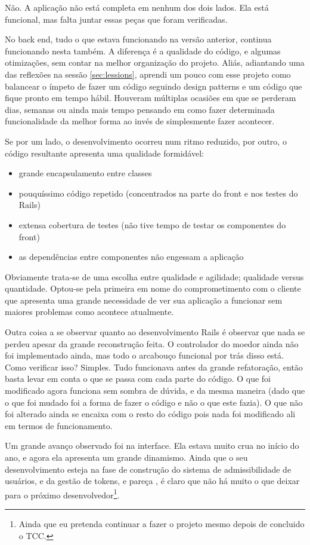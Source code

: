 Não. A aplicação não está completa em nenhum dos dois lados. Ela está funcional, mas falta juntar essas peças que foram
verificadas.

No back end, tudo o que estava funcionando  na versão anterior, continua funcionando nesta também. A diferença é a
qualidade do código, e algumas otimizações, sem contar na melhor organização do projeto. Aliás, adiantando uma das
reflexões na sessão \ref{sec:lessions}, aprendi um pouco com esse projeto como balancear o ímpeto de fazer um código
seguindo design patterns e um código que fique pronto em tempo hábil. Houveram múltiplas ocasiões em que se perderam dias,
semanas ou ainda mais tempo pensando em como fazer determinada funcionalidade da melhor forma ao invés de simplesmente
fazer acontecer.

Se por um lado, o desenvolvimento ocorreu num ritmo reduzido, por outro, o código resultante apresenta uma qualidade
formidável:
\begin{itemize}
    \item grande encapsulamento entre classes
    \item pouquíssimo código repetido (concentrados na parte do front e nos testes do Rails)
    \item extensa cobertura de testes (não tive tempo de testar os componentes do front)
    \item as dependências entre componentes não engessam a aplicação
\end{itemize}

Obviamente trata-se de uma escolha entre qualidade e agilidade; qualidade versus quantidade. Optou-se pela primeira em
nome do comprometimento com o cliente que apresenta uma grande necessidade de ver sua aplicação a funcionar sem maiores
problemas como acontece atualmente.

Outra coisa a se observar quanto ao desenvolvimento Rails é observar que nada se perdeu apesar da grande reconstrução
feita. O controlador do moedor ainda não foi implementado ainda, mas todo o arcabouço funcional por trás disso está.
Como verificar isso? Simples. Tudo funcionava antes da grande refatoração, então basta levar em conta o que se passa com
cada parte do código. O que foi modificado agora funciona sem sombra de dúvida, e da mesma maneira (dado que o que foi
mudado foi a forma de fazer o código e não o que este fazia). O que não foi alterado ainda se encaixa com o resto do
código pois nada foi modificado ali em termos de funcionamento.

Um grande avanço observado foi na interface. Ela estava muito crua no início do ano, e agora ela apresenta um grande
dinamismo. Ainda que o seu desenvolvimento esteja na fase de construção do sistema de admissibilidade de usuários, e da
gestão de tokens, e pareça , é claro que não há muito o que deixar para o próximo desenvolvedor\footnote{Ainda
que eu pretenda continuar a fazer o projeto mesmo depois de concluido o TCC.}.


